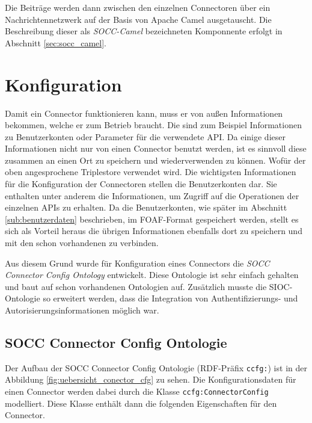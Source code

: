 Die Beiträge werden dann zwischen den einzelnen Connectoren über ein Nachrichtennetzwerk auf der Basis von Apache Camel ausgetauscht. Die Beschreibung dieser als \emph{SOCC-Camel} bezeichneten Komponnente erfolgt in Abschnitt \ref{sec:socc_camel}.


\section{Konfiguration} %
\label{sec:konfiguration}

Damit ein Connector funktionieren kann, muss er von außen Informationen bekommen, welche er zum Betrieb braucht. Die sind zum Beispiel Informationen zu Benutzerkonten oder Parameter für die verwendete API. Da einige dieser Informationen nicht nur von einen Connector benutzt werden, ist es sinnvoll diese zusammen an einen Ort zu speichern und wiederverwenden zu können. Wofür der oben angesprochene Triplestore verwendet wird. Die wichtigsten Informationen für die Konfiguration der Connectoren stellen die Benutzerkonten dar. Sie enthalten unter anderem die Informationen, um Zugriff auf die Operationen der einzelnen APIs zu erhalten. Da die Benutzerkonten, wie später im Abschnitt \ref{sub:benutzerdaten} beschrieben, im FOAF-Format gespeichert werden, stellt es sich als Vorteil heraus die übrigen Informationen ebenfalls dort zu speichern und mit den schon vorhandenen zu verbinden. 

Aus diesem Grund wurde für Konfiguration eines Connectors die \emph{SOCC Connector Config Ontology} entwickelt. Diese Ontologie ist sehr einfach gehalten und baut auf schon vorhandenen Ontologien auf. Zusätzlich musste die SIOC-Ontologie so erweitert werden, dass die Integration von Authentifizierungs- und Autorisierungsinformationen möglich war. 

\subsection{SOCC Connector Config Ontologie} %
\label{sub:connector_config_ontologie}

Der Aufbau der SOCC Connector Config Ontologie (RDF-Präfix \texttt{ccfg:}) ist in der Abbildung \ref{fig:uebersicht_conector_cfg} zu sehen. Die Konfigurationsdaten für einen Connector werden dabei durch die Klasse \texttt{ccfg:ConnectorConfig} modelliert. Diese Klasse enthält dann die folgenden Eigenschaften für den Connector.

